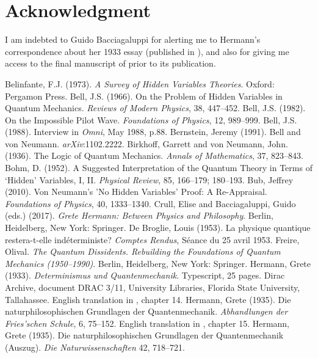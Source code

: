\documentclass[11pt]{article}
\begin{document}
\section*{Acknowledgment}
I am indebted to Guido Bacciagaluppi for alerting me to Hermann's correspondence about her 1933 essay (published in \cite{kay}), and also for giving me access to the final manuscript of \cite{crull} prior to its publication.





\begin{thebibliography}{99}
Belinfante, F.J. (1973). \emph{A Survey of Hidden Variables Theories}. Oxford: Pergamon Press.
Bell, J.S. (1966). On the Problem of Hidden Variables in Quantum Mechanics. \emph{Reviews of Modern Physics}, 38, 447--452.
Bell, J.S. (1982). On the Impossible Pilot Wave. \emph{Foundations of Physics}, 12, 989--999.
Bell, J.S. (1988). Interview in \emph{Omni}, May 1988, p.\@ 88.
Bernstein, Jeremy (1991). Bell and von Neumann. \emph{arXiv}:1102.2222.
Birkhoff, Garrett and von Neumann, John. (1936). The Logic of Quantum Mechanics. \emph{Annals of Mathematics}, 37, 823--843.
Bohm, D. (1952). A Suggested Interpretation of the Quantum Theory in Terms of `Hidden' Variables, I, II. \emph{Physical Review}, 85, 166--179; 180--193.
Bub, Jeffrey (2010). Von Neumann's 'No Hidden Variables' Proof: A Re-Appraisal. \emph{Foundations of Physics}, 40, 1333--1340.
Crull, Elise and Bacciagaluppi, Guido (eds.) (2017). \emph{Grete Hermann: Between Physics and Philosophy}. Berlin, Heidelberg, New York: Springer.
De Broglie, Louis (1953). La physique quantique restera-t-elle ind\'{e}terministe? \emph{Comptes Rendus}, S\'{e}ance du 25 avril 1953.
Freire, Olival. \emph{The Quantum Dissidents. Rebuilding the Foundations of Quantum Mechanics (1950--1990)}. Berlin, Heidelberg, New York: Springer.
Hermann, Grete (1933). \emph{Determinismus und Quantenmechanik}. Typescript, 25 pages. Dirac Archive, document DRAC 3/11, University Libraries, Florida State University, Tallahassee. English translation in \cite{crull}, chapter 14.
Hermann, Grete (1935). Die naturphilosophischen Grundlagen der Quantenmechanik. \emph{Abhandlungen der Fries'schen Schule}, 6, 75--152.
English translation in \cite{crull}, chapter 15.
Hermann, Grete  (1935). Die naturphilosophischen Grundlagen der Quantenmechanik (Auszug). \emph{Die Naturwissenschaften} 42, 718--721.

\end{thebibliography}
\end{document}

